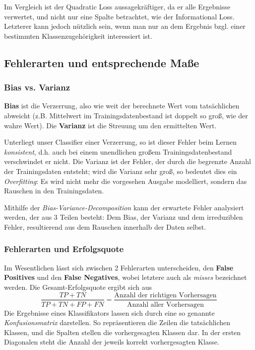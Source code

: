 Im Vergleich ist der Quadratic Loss aussagekräftiger, da er alle Ergebnisse verwertet,
und nicht nur eine Spalte betrachtet, wie der Informational Loss. Letzterer
kann jedoch nützlich sein, wenn man nur an dem Ergebnis bzgl. einer bestimmten
Klassenzugehörigkeit interessiert ist.

\subsection{Fehlerarten und entsprechende Maße}
\subsubsection{Bias vs. Varianz}
\textbf{Bias} ist die Verzerrung, also wie weit der berechnete Wert vom tatsächlichen
abweicht (z.B. Mittelwert im Trainingsdatenbestand ist doppelt so groß, wie der
wahre Wert). Die \textbf{Varianz} ist die Streuung um den ermittelten Wert.

Unterliegt unser Classifier einer Verzerrung, so ist dieser Fehler beim Lernen
\textit{konsistent}, d.h. auch bei einem unendlichen großem Trainingsdatenbestand
verschwindet er nicht. Die Varianz ist der Fehler, der durch die begrenzte Anzahl
der Trainingsdaten entsteht; wird die Varianz sehr groß, so bedeutet dies ein
\textit{Overfitting}: Es wird nicht mehr die vorgesehen Ausgabe modelliert, sondern
das Rauschen in den Trainingsdaten.

Mithilfe der \textit{Bias-Variance-Decomposition} kann der erwartete Fehler 
analysiert werden, der aus 3 Teilen besteht: Dem Bias, der Varianz und dem
irreduziblen Fehler, resultierend aus dem Rauschen innerhalb der Daten selbst.

\subsubsection{Fehlerarten und Erfolgsquote}
Im Wesentlichen lässt sich zwischen 2 Fehlerarten unterscheiden, den 
\textbf{False Positives} und den \textbf{False Negatives}, wobei letztere auch als
\textit{misses} bezeichnet werden. Die Gesamt-Erfolgsquote ergibt sich aus
\[
	\frac{TP+TN}{TP+TN+FP+FN} = \frac{\text{Anzahl der richtigen Vorhersagen}}
	{\text{Anzahl aller Vorhersagen}}
\]
Die Ergebnisse eines Klassifikators lassen sich durch eine so genannte
\textit{Konfusionsmatrix} darstellen. So repräsentieren die Zeilen die tatsächlichen
Klassen, und die Spalten stellen die vorhergesagten Klassen dar. In der ersten Diagonalen
steht die Anzahl der jeweils korrekt vorhergesagten Klasse.

